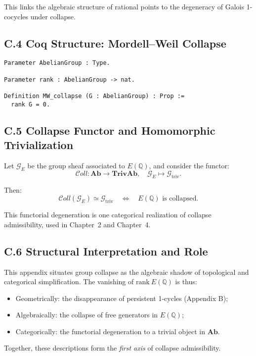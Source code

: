 \documentclass[11pt]{article}
\begin{document}
This links the algebraic structure of rational points to the degeneracy of Galois 1-cocycles under collapse.

\subsection*{C.4 Coq Structure: Mordell–Weil Collapse}
\begin{lstlisting}[language=Coq]
Parameter AbelianGroup : Type.

Parameter rank : AbelianGroup -> nat.

Definition MW_collapse (G : AbelianGroup) : Prop :=
  rank G = 0.
\end{lstlisting}

\subsection*{C.5 Collapse Functor and Homomorphic Trivialization}

Let \( \mathcal{G}_{E} \) be the group sheaf associated to \( E(\mathbb{Q}) \), and consider the functor:
\[
\mathcal{C}oll: \mathbf{Ab} \rightarrow \mathbf{TrivAb}, \quad \mathcal{G}_E \mapsto \mathcal{G}_{\mathrm{triv}}.
\]

Then:
\[
\mathcal{C}oll(\mathcal{G}_E) \simeq \mathcal{G}_{\mathrm{triv}} \quad \Longleftrightarrow \quad E(\mathbb{Q}) \text{ is collapsed.}
\]

This functorial degeneration is one categorical realization of collapse admissibility, used in Chapter~2 and Chapter~4.

\subsection*{C.6 Structural Interpretation and Role}

This appendix situates group collapse as the algebraic shadow of topological and categorical simplification. The vanishing of \( \mathrm{rank}~E(\mathbb{Q}) \) is thus:
\begin{itemize}
  \item Geometrically: the disappearance of persistent 1-cycles (Appendix B);
  \item Algebraically: the collapse of free generators in \( E(\mathbb{Q}) \);
  \item Categorically: the functorial degeneration to a trivial object in \( \mathbf{Ab} \).
\end{itemize}

Together, these descriptions form the \emph{first axis} of collapse admissibility.
\end{document}
